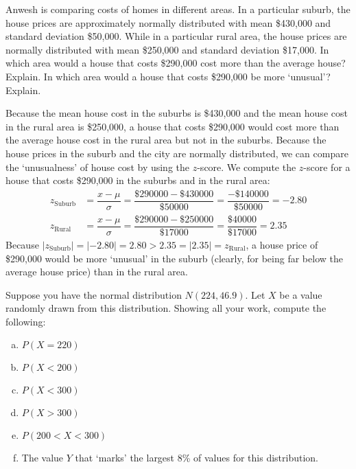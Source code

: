 \documentclass[11pt,letterpaper]{article}
\begin{document}

 Anwesh is comparing costs of homes in different areas. In a particular suburb, the house prices are approximately normally distributed with mean \$430,000 and standard deviation \$50,000. While in a particular rural area, the house prices are normally distributed with mean \$250,000 and standard deviation \$17,000. In which area would a house that costs \$290,000 cost more than the average house? Explain. In which area would a house that costs \$290,000 be more `unusual'? Explain. \pspace

\sol Because the mean house cost in the suburbs is \$430,000 and the mean house cost in the rural area is \$250,000, a house that costs \$290,000 would cost more than the average house cost in the rural area but not in the suburbs. Because the house prices in the suburb and the city are normally distributed, we can compare the `unusualness' of house cost by using the $z$-score. We compute the $z$-score for a house that costs \$290,000 in the suburbs and in the rural area:
	\[
	\begin{aligned}
	z_{\text{Suburb}}&= \dfrac{x - \mu}{\sigma}= \dfrac{\$290000 - \$430000}{\$50000}= \dfrac{-\$140000}{\$50000}= -2.80 \\[0.3cm]
	z_{\text{Rural}}&= \dfrac{x - \mu}{\sigma}= \dfrac{\$290000 - \$250000}{\$17000}= \dfrac{\$40000}{\$17000}= 2.35
	\end{aligned}
	\]
Because $|z_{\text{Suburb}}|= |-2.80| = 2.80 > 2.35 = |2.35|= z_{\text{Rural}}$, a house price of \$290,000 would be more `unusual' in the suburb (clearly, for being far below the average house price) than in the rural area. 



\newpage



 Suppose you have the normal distribution $N(224, 46.9)$. Let $X$ be a value randomly drawn from this distribution. Showing all your work, compute the following:
	\begin{enumerate}[(a)]
	\item $P(X= 220)$
	\item $P(X < 200)$
	\item $P(X < 300)$
	\item $P(X > 300)$
	\item $P(200 < X < 300)$
	\item The value $Y$ that `marks' the largest 8\% of values for this distribution. 
	\end{enumerate} \pspace
\end{document}

